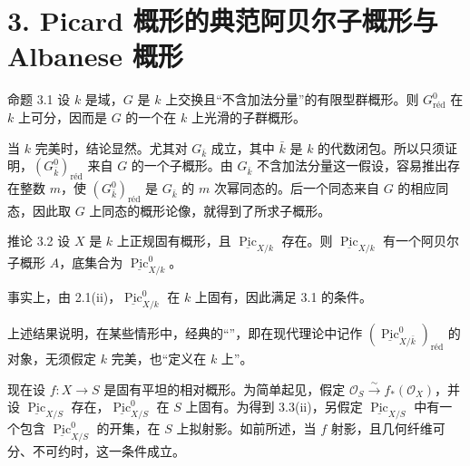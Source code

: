 \section*{3. Picard 概形的典范阿贝尔子概形与 Albanese 概形}
\begin{statement}{命题 3.1}
设 $k$ 是域，$G$ 是 $k$ 上交换且“不含加法分量”的有限型群概形。则 $G^0_{\text{réd}}$ 在 $k$ 上可分，因而是 $G$ 的一个在 $k$ 上光滑的子群概形。
\end{statement}
当 $k$ 完美时，结论显然。尤其对 $G_{\bar k}$ 成立，其中 $\bar k$ 是 $k$ 的代数闭包。所以只须证明，$(G^0_{\bar k})_{\text{réd}}$ 来自 $G$ 的一个子概形。由 $G_{\bar k}$ 不含加法分量这一假设，容易推出存在整数 $m$，使 $(G^0_{\bar k})_{\text{réd}}$ 是 $G_{\bar k}$ 的 $m$ 次幂同态的。后一个同态来自 $G$ 的相应同态，因此取 $G$ 上同态的概形论像，就得到了所求子概形。

\begin{statement}{推论 3.2}
设 $X$ 是 $k$ 上正规固有概形，且 $\underline{\operatorname{Pic}}_{X/k}$ 存在。则 $\underline{\operatorname{Pic}}_{X/k}$ 有一个阿贝尔子概形 $A$，底集合为 $\underline{\operatorname{Pic}}^0_{X/k}$。
\end{statement}
事实上，由 2.1(ii)，$\underline{\operatorname{Pic}}^0_{X/k}$ 在 $k$ 上固有，因此满足 3.1 的条件。

上述结果说明，在某些情形中，经典的“”，即在现代理论中记作 $(\underline{\operatorname{Pic}}^0_{X/\bar k})_{\text{réd}}$ 的对象，无须假定 $k$ 完美，也“定义在 $k$ 上”。

现在设 $f\colon X\to S$ 是固有平坦的相对概形。为简单起见，假定 $\mathcal O_S\xrightarrow{\sim}f_*(\mathcal O_X)$，并设 $\underline{\operatorname{Pic}}_{X/S}$ 存在，$\underline{\operatorname{Pic}}^0_{X/S}$ 在 $S$ 上固有。为得到 3.3(ii)，另假定 $\underline{\operatorname{Pic}}_{X/S}$ 中有一个包含 $\underline{\operatorname{Pic}}^0_{X/S}$ 的开集，在 $S$ 上拟射影。如前所述，当 $f$ 射影，且几何纤维可分、不可约时，这一条件成立。

